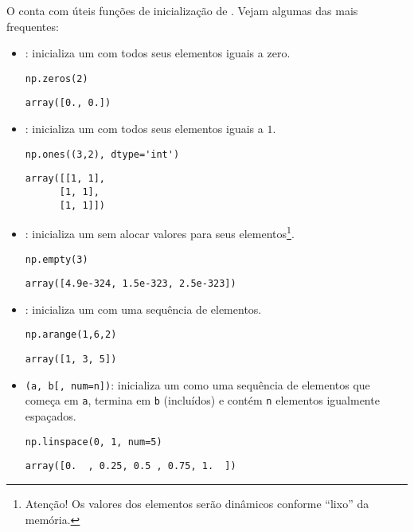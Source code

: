 O {\numpy} conta com úteis funções de inicialização de {\PYTHONnumpyDOTarray}. Vejam algumas das mais frequentes:
\begin{itemize}
\item \hl{\PYTHONnumpyDOTzeros}: inicializa um {\PYTHONnumpyDOTarray} com todos seus elementos iguais a zero.
  
\begin{lstlisting}
np.zeros(2)
\end{lstlisting}

\begin{verbatim}
array([0., 0.])
\end{verbatim}

  \item \hl{\PYTHONnumpyDOTones}: inicializa um {\PYTHONnumpyDOTarray} com todos seus elementos iguais a $1$.

\begin{lstlisting}
np.ones((3,2), dtype='int')
\end{lstlisting}

\begin{verbatim}
array([[1, 1],
      [1, 1],
      [1, 1]])
\end{verbatim}

  \item \hl{\PYTHONnumpyDOTempty}: inicializa um {\PYTHONnumpyDOTarray} sem alocar valores para seus elementos\footnote{Atenção! Os valores dos elementos serão dinâmicos conforme ``lixo'' da memória.}.
  
\begin{lstlisting}
np.empty(3)
\end{lstlisting}

\begin{verbatim}
array([4.9e-324, 1.5e-323, 2.5e-323])
\end{verbatim}

  \item \hl{\PYTHONnumpyDOTarange}: inicializa um {\PYTHONnumpyDOTarray} com uma sequência de elementos.

\begin{lstlisting}
np.arange(1,6,2)
\end{lstlisting}

\begin{verbatim}
array([1, 3, 5])
\end{verbatim}

  \item \hl{\PYTHONnumpyDOTlinspace}\texttt{(a, b[, num=n])}: inicializa um {\PYTHONnumpyDOTarray} como uma sequência de elementos que começa em \texttt{a}, termina em \texttt{b} (incluídos) e contém \texttt{n} elementos igualmente espaçados.

\begin{lstlisting}
np.linspace(0, 1, num=5)
\end{lstlisting}

\begin{verbatim}
array([0.  , 0.25, 0.5 , 0.75, 1.  ])
\end{verbatim}

\end{itemize}

